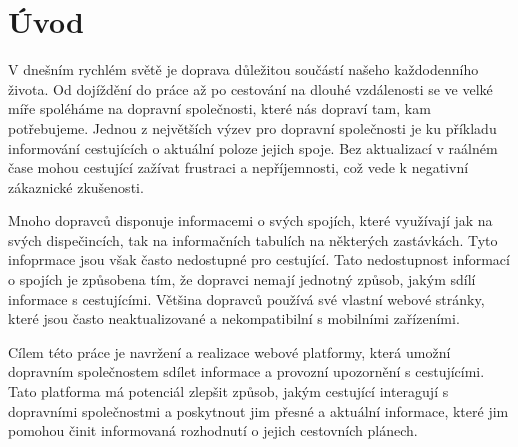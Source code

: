 \chapter{Úvod}
V dnešním rychlém světě je doprava důležitou součástí našeho každodenního života. Od dojíždění do práce až po cestování na dlouhé vzdálenosti se ve velké míře spoléháme na dopravní společnosti, které nás dopraví tam, kam potřebujeme. Jednou z největších výzev pro dopravní společnosti je ku příkladu informování cestujících o aktuální poloze jejich spoje. Bez aktualizací v raálném čase mohou cestující zažívat frustraci a nepříjemnosti, což vede k negativní zákaznické zkušenosti.\par
Mnoho dopravců disponuje informacemi o svých spojích, které využívají jak na svých dispečincích, tak na informačních tabulích na některých zastávkách. Tyto infoprmace jsou však často nedostupné pro cestující. Tato nedostupnost informací o spojích je způsobena tím, že dopravci nemají jednotný způsob, jakým sdílí informace s cestujícími. Většina dopravců používá své vlastní webové stránky, které jsou často neaktualizované a nekompatibilní s mobilními zařízeními.\par
Cílem této práce je navržení a realizace webové platformy, která umožní dopravním společnostem sdílet informace a provozní upozornění s cestujícími. Tato platforma má potenciál zlepšit způsob, jakým cestující interagují s dopravními společnostmi a poskytnout jim přesné a aktuální informace, které jim pomohou činit informovaná rozhodnutí o jejich cestovních plánech. 
